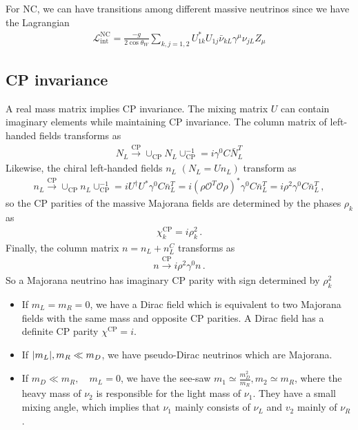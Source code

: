 \documentclass[twocolumn]{article}
\begin{document}
For NC, we can have transitions among different massive neutrinos since we have the Lagrangian
\begin{align*}
  \mathcal{L}^\text{NC}_\text{int} = \frac{-g}{2\cos{\theta_W}} \sum_{k,j=1,2} U^*_{1k}U_{1j} \bar{\nu}_{kL}\gamma^\mu \nu_{jL} Z_\mu
\end{align*}

\subsection{CP invariance}
A real mass matrix implies CP invariance. The mixing matrix $U$ can contain imaginary elements while maintaining CP invariance. The column matrix of left-handed fields transforms as 
\begin{align*}
  N_L \overset{\text{CP}}{\to} \cup_\text{CP} N_L \cup_{\mathrm{CP}}^{-1} = i \gamma^0 C \bar{N}_L^T
\end{align*}
Likewise, the chiral left-handed fields $n_L$ $(N_L = Un_L)$ transform as
\begin{align*}
  n_L \overset{\text{CP}}{\to} \cup_\text{CP} n_L \cup_{\mathrm{CP}}^{-1} = i U^\dagger U^* \gamma^0 C \bar{n}_L^T = i (\rho \mathcal{O}^T \mathcal{O}\rho)^* \gamma^0 C \bar{n}_L^T = i \rho^2 \gamma^0 C \bar{n}_L^T\,,
\end{align*}
so the  CP parities of the massive Majorana fields are determined by the phases $\rho_k$ as
\begin{align*}
  \chi^\text{CP}_k = i \rho^2_k\,.
\end{align*}
Finally, the column matrix $n = n_L + n_L^C$ transforms as
\begin{align*}
  n \overset{\text{CP}}{\to}  i \rho^2 \gamma^0 n\,.
\end{align*}
So a Majorana neutrino has imaginary CP parity with sign determined by $\rho^2_k$
\begin{itemize}
  \item If $m_L = m_R = 0$, we have a Dirac field which is equivalent to two Majorana fields with the
same mass and opposite CP parities. A Dirac field has a definite CP parity $\chi^\text{CP} = i$.
  \item If $\abs{m_L}, m_R \ll m_D$, we have pseudo-Dirac neutrinos which are Majorana. 
  \item If $m_D \ll m_R, \quad m_L = 0$, we have the see-saw $m_1 \simeq \frac{m_D^2}{m_R}, m_2 \simeq m_R$, where the heavy mass of $\nu_2$ is responsible for the light mass of $\nu_1$. They have a small mixing angle, which implies that $\nu_1$ mainly consists of $\nu_L$ and $v_2$ mainly of $\nu_R$. 
\end{itemize}
\end{document}

